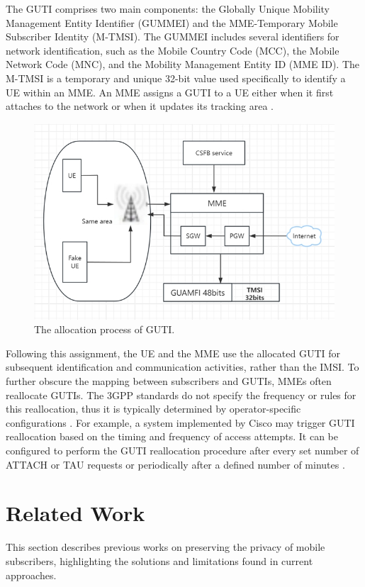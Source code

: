 \documentclass[sigplan,screen]{acmart}
\begin{document}
The GUTI comprises two main components: the Globally Unique Mobility Management Entity Identifier (GUMMEI) and the MME-Temporary Mobile Subscriber Identity (M-TMSI). The GUMMEI includes several identifiers for network identification, such as the Mobile Country Code (MCC), the Mobile Network Code (MNC), and the Mobility Management Entity ID (MME ID). The M-TMSI is a temporary and unique 32-bit value used specifically to identify a UE within an MME. An MME assigns a GUTI to a UE either when it first attaches to the network or when it updates its tracking area \cite{cheshire2015fake}.



\begin{figure}[htbp]
\centering
\includegraphics[width=\linewidth]{gutiAllocation.png}
\caption{The allocation process of GUTI.}
\end{figure}

Following this assignment, the UE and the MME use the allocated GUTI for subsequent identification and communication activities, rather than the IMSI. To further obscure the mapping between subscribers and GUTIs, MMEs often reallocate GUTIs. The 3GPP standards do not specify the frequency or rules for this reallocation, thus it is typically determined by operator-specific configurations \cite{3gpp23003}. For example, a system implemented by Cisco may trigger GUTI reallocation based on the timing and frequency of access attempts. It can be configured to perform the GUTI reallocation procedure after every set number of ATTACH or TAU requests or periodically after a defined number of minutes \cite{hong2018guti}.

\section{Related Work}
This section describes previous works on preserving the privacy of mobile subscribers, highlighting the solutions and limitations found in current approaches.
\end{document}
